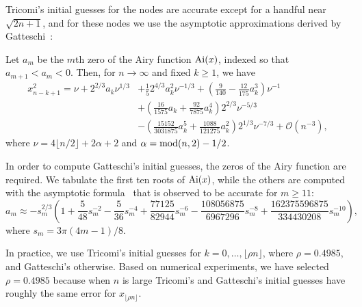 \documentclass[final]{siamltex}
\begin{document}
Tricomi's initial guesses for the nodes are accurate except for a handful near 
$\sqrt{2n+1}$, and for these nodes we use the asymptotic approximations derived by Gatteschi~\cite{Gatteschi_02_01}: 
\begin{lemma}
Let $a_m$ be the $m$th zero of the Airy function ${\rm Ai}(x)$, indexed so that $a_{m+1}<a_m<0$. Then, for $n\rightarrow\infty$ and fixed $k\geq 1$, we have
\[
\begin{aligned}
x_{n-k+1}^2 = \nu + 2^{2/3}a_k\nu^{1/3} &+ \frac{1}{5}2^{4/3} a_k^2 \nu^{-1/3} + \left(\frac{9}{140} - \frac{12}{175}a_k^3\right)\nu^{-1}\\
&+ \left(\frac{16}{1575}a_k + \frac{92}{7875}a_k^4\right)2^{2/3}\nu^{-5/3} \\
&- \left(\frac{15152}{3031875}a_k^5 + \frac{1088}{121275}a_k^2\right)2^{1/3}\nu^{-7/3} + \mathcal{O}(n^{-3}),
\end{aligned}
\]
where $\nu = 4\lfloor n/2\rfloor + 2\alpha + 2$ and $\alpha = {\rm mod}(n,2) - 1/2$. 
\label{lem:gatteschi}
\end{lemma}

In order to compute Gatteschi's initial guesses, the  
zeros of the Airy function are required. We tabulate the first ten roots of 
${\rm Ai}(x)$, while the others are computed with the asymptotic formula~\cite[(9.9.18)]{NISTHandbook} that is observed to be accurate for $m\geq 11$:
\[
a_m \approx -s_m^{2/3}\left(1+\frac{5}{48}s_m^{-2}-\frac{5}{36}s_m^{-4}+\frac{77125}{82944}s_m^{-6} -\frac{108056875}{6967296}s_m^{-8}+\frac{162375596875}{334430208}s_m^{-10}\right),
\]
where $s_m = 3\pi(4m-1)/8$.

In practice, we use Tricomi's initial guesses for $k = 0,\ldots,\lfloor \rho n\rfloor$, where $\rho = 0.4985$, and 
Gatteschi's otherwise. Based on numerical experiments, we have selected $\rho= 0.4985$ because when $n$ is 
large Tricomi's and Gatteschi's initial guesses have roughly the same error for $x_{\lfloor\rho n\rfloor}$. 
\end{document}
